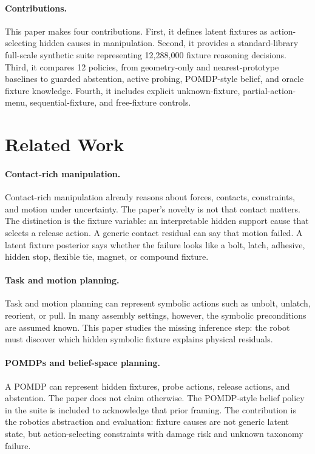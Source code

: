 \documentclass{article}
\begin{document}
\paragraph{Contributions.}
This paper makes four contributions. First, it defines latent fixtures as
action-selecting hidden causes in manipulation. Second, it provides a
standard-library full-scale synthetic suite representing 12,288,000 fixture
reasoning decisions. Third, it compares 12 policies, from geometry-only and
nearest-prototype baselines to guarded abstention, active probing,
POMDP-style belief, and oracle fixture knowledge. Fourth, it includes explicit
unknown-fixture, partial-action-menu, sequential-fixture, and free-fixture
controls.

\section{Related Work}

\paragraph{Contact-rich manipulation.}
Contact-rich manipulation already reasons about forces, contacts, constraints,
and motion under uncertainty. The paper's novelty is not that contact matters.
The distinction is the fixture variable: an interpretable hidden support cause
that selects a release action. A generic contact residual can say that motion
failed. A latent fixture posterior says whether the failure looks like a bolt,
latch, adhesive, hidden stop, flexible tie, magnet, or compound fixture.

\paragraph{Task and motion planning.}
Task and motion planning can represent symbolic actions such as unbolt,
unlatch, reorient, or pull. In many assembly settings, however, the symbolic
preconditions are assumed known. This paper studies the missing inference
step: the robot must discover which hidden symbolic fixture explains physical
residuals.

\paragraph{POMDPs and belief-space planning.}
A POMDP can represent hidden fixtures, probe actions, release actions, and
abstention. The paper does not claim otherwise. The POMDP-style belief policy
in the suite is included to acknowledge that prior framing. The contribution
is the robotics abstraction and evaluation: fixture causes are not generic
latent state, but action-selecting constraints with damage risk and unknown
taxonomy failure.
\end{document}
